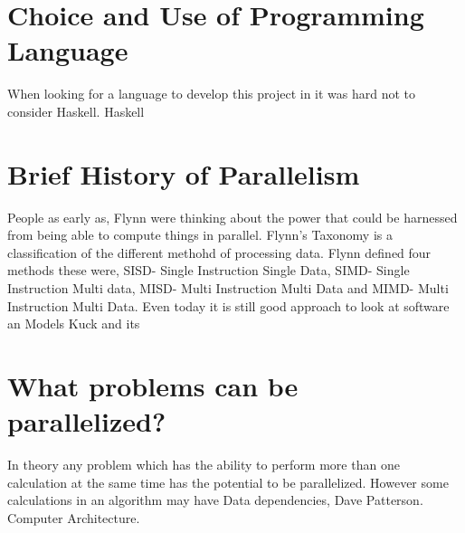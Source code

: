 \documentclass{report}
\begin{document}
\section{Choice and Use of Programming Language}

When looking for a language to develop this project in it was hard not to consider Haskell. Haskell

\section {Brief History of Parallelism}
People as early as, Flynn were thinking about the power that could be harnessed from being able to compute things in parallel.
Flynn's Taxonomy is a classification of the different methohd of processing data. Flynn defined four methods these were, SISD- Single Instruction Single Data, SIMD- Single Instruction Multi data, MISD- Multi Instruction Multi Data and MIMD- Multi Instruction Multi Data. Even today it is still good approach to look at software an
Models Kuck and its

\section {What problems can be parallelized?}
In theory any problem which has the ability to perform more than one calculation at the same time has the potential to be parallelized. However some calculations in an algorithm may have Data dependencies, 
Dave Patterson. Computer Architecture.
\end{document}
